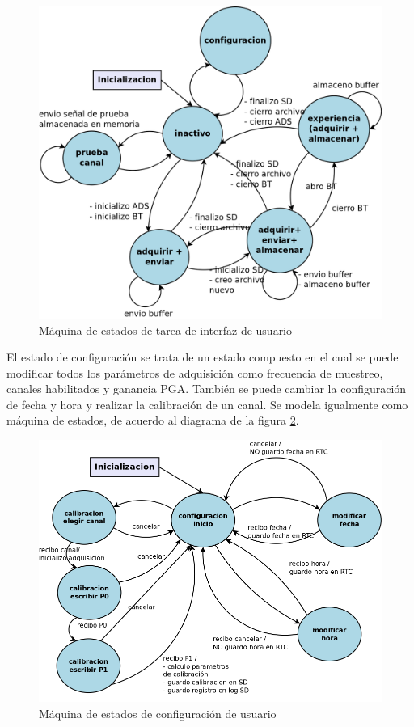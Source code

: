 \begin{figure}[!htbp]
	\centering
	\includegraphics[scale=0.18]{./Figures/VOP_mde_v1.png}
	\caption{Máquina de estados de tarea de interfaz de usuario}
	\label{fig:VOP_mde_v1}
\end{figure}


El estado de configuración se trata de un estado compuesto en el cual se puede modificar todos los parámetros de adquisición como frecuencia de muestreo, canales habilitados y ganancia PGA. También se  puede cambiar la configuración de fecha y hora y realizar la calibración de un canal. Se modela igualmente como máquina de estados, de acuerdo al diagrama de la figura \ref{fig:VOP24_configuracion_v1}.

\begin{figure}[!htbp]
	\centering
	\includegraphics[scale=0.28]{./Figures/VOP24_configuracion_v1.png}
	\caption{Máquina de estados de configuración de usuario}
	\label{fig:VOP24_configuracion_v1}
\end{figure}

